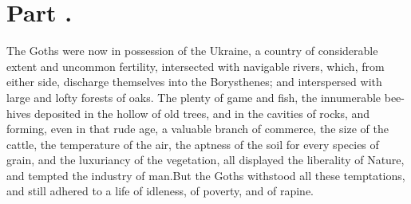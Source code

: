 \section{Part \thesection.}
\thispagestyle{simple}

The Goths were now in possession of the Ukraine, a country of
considerable extent and uncommon fertility, intersected with
navigable rivers, which, from either side, discharge themselves
into the Borysthenes; and interspersed with large and lofty
forests of oaks. The plenty of game and fish, the innumerable
bee-hives deposited in the hollow of old trees, and in the
cavities of rocks, and forming, even in that rude age, a valuable
branch of commerce, the size of the cattle, the temperature of
the air, the aptness of the soil for every species of grain, and
the luxuriancy of the vegetation, all displayed the liberality of
Nature, and tempted the industry of man.\footnotemark[28] But the Goths
withstood all these temptations, and still adhered to a life of
idleness, of poverty, and of rapine.


